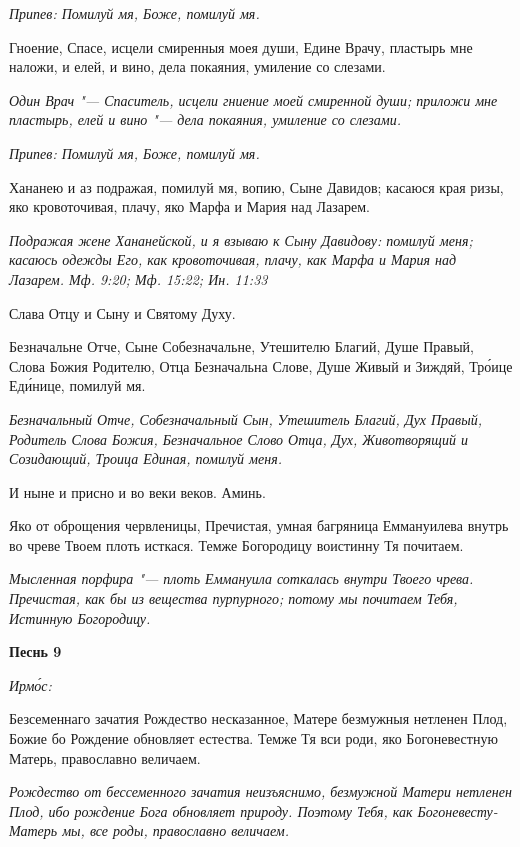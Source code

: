 \itshape Припев:\normalfont{} Помилуй мя, Боже, помилуй мя.


Гноение, Спасе, исцели смиренныя моея души, Едине Врачу, пластырь мне наложи, и елей, и вино, дела покаяния, умиление со слезами.


\itshape Один Врач "--- Спаситель, исцели гниение моей смиренной души; приложи мне пластырь, елей и вино "--- дела покаяния, умиление со слезами.\normalfont{}


\itshape Припев:\normalfont{} Помилуй мя, Боже, помилуй мя.


Хананею и аз подражая, помилуй мя, вопию, Сыне Давидов; касаюся края ризы, яко кровоточивая, плачу, яко Марфа и Мария над Лазарем.


\itshape Подражая жене Хананейской, и я взываю к Сыну Давидову: помилуй меня; касаюсь одежды Его, как кровоточивая, плачу, как Марфа и Мария над Лазарем. Мф. 9:20; Мф. 15:22; Ин. 11:33\normalfont{}


Слава Отцу и Сыну и Святому Духу.


Безначальне Отче, Сыне Собезначальне, Утешителю Благий, Душе Правый, Слова Божия Родителю, Отца Безначальна Слове, Душе Живый и Зиждяй, Тро́ице Еди́нице, помилуй мя.


\itshape Безначальный Отче, Собезначальный Сын, Утешитель Благий, Дух Правый, Родитель Слова Божия, Безначальное Слово Отца, Дух, Животворящий и Созидающий, Троица Единая, помилуй меня.\normalfont{}


И ныне и присно и во веки веков. Аминь.


Яко от оброщения червленицы, Пречистая, умная багряница Еммануилева внутрь во чреве Твоем плоть исткася. Темже Богородицу воистинну Тя почитаем.


\itshape Мысленная порфира "--- плоть Еммануила соткалась внутри Твоего чрева. Пречистая, как бы из вещества пурпурного; потому мы почитаем Тебя, Истинную Богородицу.\normalfont{}





\bfseries Песнь 9\normalfont{}


\itshape Ирмо́с:\normalfont{}


Безсеменнаго зачатия Рождество несказанное, Матере безмужныя нетленен Плод, Божие бо Рождение обновляет естества. Темже Тя вси роди, яко Богоневестную Матерь, православно величаем.


\itshape Рождество от бессеменного зачатия неизъяснимо, безмужной Матери нетленен Плод, ибо рождение Бога обновляет природу. Поэтому Тебя, как Богоневесту-Матерь мы, все роды, православно величаем.\normalfont{}


